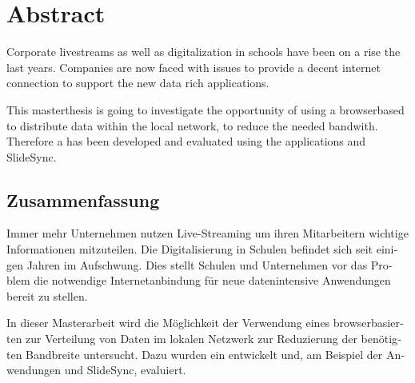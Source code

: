 \begingroup
\let\clearpage\relax
\let\cleardoublepage\relax
\let\cleardoublepage\relax

\chapter*{Abstract}

Corporate livestreams as well as digitalization in schools have been on a rise the last years. Companies are now faced with issues to provide a decent internet connection to support the new data rich applications.

This masterthesis is going to investigate the opportunity of using a browserbased \pTp \cdn to distribute data within the local network, to reduce the needed bandwith. Therefore a \pTp \cdn has been developed and evaluated using the applications \schulCloud and SlideSync.

\vfill

\begin{otherlanguage}{ngerman}
\chapter*{Zusammenfassung}
Immer mehr Unternehmen nutzen Live-Streaming um ihren Mitarbeitern wichtige Informationen mitzuteilen. Die Digitalisierung in Schulen befindet sich seit einigen Jahren im Aufschwung. Dies stellt Schulen und Unternehmen vor das Problem die notwendige Internetanbindung für neue datenintensive Anwendungen bereit zu stellen. 

In dieser Masterarbeit wird die Möglichkeit der Verwendung eines browserbasierten \pTp \cdns zur Verteilung von Daten im lokalen Netzwerk zur Reduzierung der benötigten Bandbreite untersucht. Dazu wurden ein \pTp \cdn entwickelt und, am Beispiel der Anwendungen \schulCloud und SlideSync, evaluiert.
\end{otherlanguage}

\endgroup			

\vfill